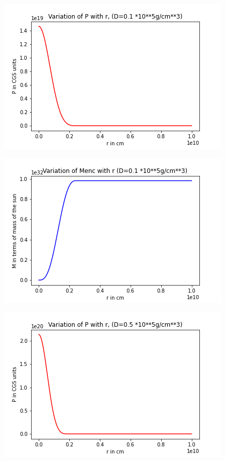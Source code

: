 \documentclass{article}
\begin{document}
 \begin{center}
\begin{multicols}{2}
	\begin{center}
        \includegraphics[scale=0.3]{Images/Pr_pb1_0}
        \end{center}
\columnbreak
       \includegraphics[scale=0.3]{Images/Mr_pb1_0}
\end{multicols}
\begin{multicols}{2}
	\begin{center}
        \includegraphics[scale=0.3]{Images/Pr_pb1_1}

\end{center}
\end{multicols}
\end{center}
\end{document}

